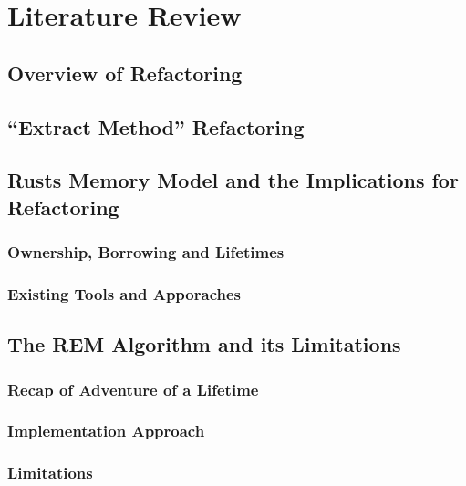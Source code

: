 \chapter[Chapter 1]{Literature Review}
\label{chap:lit_review}

\section{Overview of Refactoring}
\label{sec:overview_refactoring}

\section{``Extract Method'' Refactoring}
\label{sec:extract_method}

\section{Rusts Memory Model and the Implications for Refactoring}
\label{sec:rust_memory_model}

\subsection{Ownership, Borrowing and Lifetimes}
\label{sec:ownership_borrowing_lifetimes}

\subsection{Existing Tools and Apporaches}
\label{sec:existing_tools_approaches}

\section{The REM Algorithm and its Limitations}
\label{sec:rem_algorithm_limitations}

\subsection{Recap of Adventure of a Lifetime}
\label{sec:recap_adventure_lifetime}

\subsection{Implementation Approach}
\label{sec:implementation_approach}

\subsection{Limitations}
\label{sec:limitations_of_aol}

